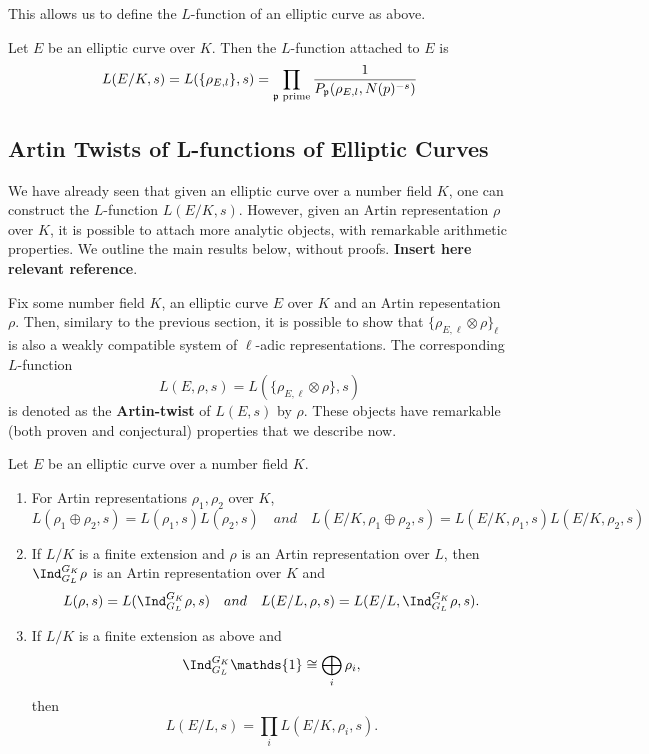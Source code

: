 This allows us to define the $L$-function of an elliptic curve as above.

\begin{defn}
    Let $E$ be an elliptic curve over $K$. Then the $L$-function attached to $E$ is 
    $$L(E/K,s)=L(\{\rho_{E,l}\},s)=\prod_{\mathfrak{p}\text{ prime}}\frac{1}{P_{\mathfrak{p}}(\rho_{E,l},N(p)^{-s})}$$
\end{defn}

\subsection{Artin Twists of L-functions of Elliptic Curves}

We have already seen that given an elliptic curve over a number field $K$, one can construct the $L$-function $L(E/K,s)$. However, given an Artin representation $\rho$ over $K$, it is possible to attach more analytic objects, with remarkable arithmetic properties. We outline the main results below, without proofs. \textbf{Insert here relevant reference}. 

Fix some number field $K$, an elliptic curve $E$ over $K$ and an Artin repesentation $\rho$. Then, similary to the previous section, it is possible to show that $\{\rho_{E,\ell}\otimes\rho\}_\ell$ is also a weakly compatible system of $\ell$-adic representations. The corresponding $L$-function
$$L(E,\rho,s)=L(\{\rho_{E,\ell}\otimes\rho\},s)$$
is denoted as the \textbf{Artin-twist} of $L(E,s)$ by $\rho$. These objects have remarkable (both proven and conjectural) properties that we describe now.

\begin{thm}
    Let $E$ be an elliptic curve over a number field $K$.
    \begin{enumerate}
        \item For Artin representations $\rho_1,\rho_2$ over $K$,
        $$L(\rho_1\oplus\rho_2,s)=L(\rho_1,s)L(\rho_2,s)\quad and\quad L(E/K,\rho_1\oplus\rho_2,s)=L(E/K,\rho_1,s)L(E/K,\rho_2,s)$$
        \item If $L/K$ is a finite extension and $\rho$ is an Artin representation over $L$, then $\Ind_{G_L}^{G_K}\rho$ is an Artin representation over $K$ and 
        $$L(\rho,s)=L(\Ind_{G_L}^{G_K}\rho,s)\quad and\quad L(E/L,\rho,s)=L(E/L,\Ind_{G_L}^{G_K}\rho,s).$$
        \item If $L/K$ is a finite extension as above and 
        $$\Ind_{G_L}^{G_K}\mathds{1}\cong\bigoplus_i\rho_i,$$
        then
        $$L(E/L,s)=\prod_i L(E/K,\rho_i,s).$$
    \end{enumerate}
\end{thm}

